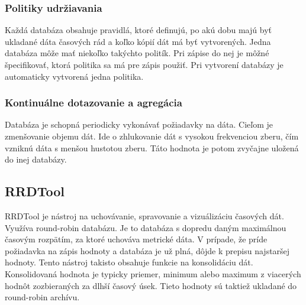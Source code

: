 \documentclass[12pt,twoside,color,cover,table]{fithesis3}
\begin{document}
\subsubsection{Politiky udržiavania}
Každá databáza obsahuje pravidlá, ktoré definujú, po akú dobu majú byť ukladané dáta časových rád a koľko kópií dát má byť vytvorených. Jedna databáza môže mať niekoľko takýchto politík. Pri zápise 
do nej je môžné špecifikovať, ktorá politika sa má pre zápis použiť. Pri vytvorení databázy je automaticky vytvorená jedna politika.

\subsubsection{Kontinuálne dotazovanie a agregácia}
Databáza je schopná periodicky vykonávať požiadavky na dáta. Cieľom je zmenšovanie objemu dát. Ide o zhlukovanie dát s vysokou frekvenciou zberu, čím vzniknú dáta s menšou hustotou zberu. Táto hodnota je 
potom zvyčajne uložená do inej databázy.

\subsection{RRDTool}
RRDTool je nástroj na uchovávanie, spravovanie a vizuálizáciu časových dát. Využíva round-robin databázu. Je to databáza s dopredu daným maximálnou časovým rozpätím, za ktoré uchováva metrické dáta.
V prípade, že príde požiadavka na zápis hodnoty a databáza je už plná, dôjde k prepisu najstaršej hodnoty. Tento nástroj takisto obsahuje funkcie na konsolidáciu dát. 
Konsolidovaná hodnota je typicky priemer, minimum alebo maximum z viacerých hodnôt zozbieraných za dlhší časový úsek. Tieto hodnoty sú taktiež ukladané do round-robin archívu.
\end{document}
